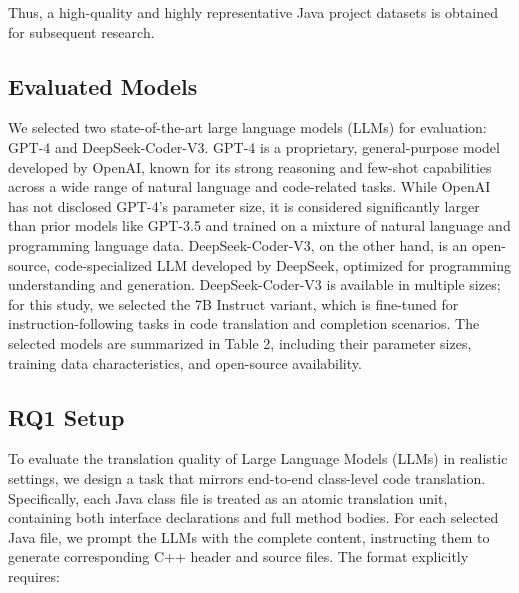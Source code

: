 Thus, a high-quality and highly representative Java project datasets is obtained for subsequent research.




\subsection{Evaluated Models}

We selected two state-of-the-art large language models (LLMs) for evaluation: GPT-4 and DeepSeek-Coder-V3. GPT-4 is a proprietary, general-purpose model developed by OpenAI, known for its strong reasoning and few-shot capabilities across a wide range of natural language and code-related tasks. While OpenAI has not disclosed GPT-4’s parameter size, it is considered significantly larger than prior models like GPT-3.5 and trained on a mixture of natural language and programming language data. DeepSeek-Coder-V3, on the other hand, is an open-source, code-specialized LLM developed by DeepSeek, optimized for programming understanding and generation. DeepSeek-Coder-V3 is available in multiple sizes; for this study, we selected the 7B Instruct variant, which is fine-tuned for instruction-following tasks in code translation and completion scenarios. The selected models are summarized in Table 2, including their parameter sizes, training data characteristics, and open-source availability.


\subsection{RQ1 Setup}
To evaluate the translation quality of Large Language Models (LLMs) in realistic settings, we design a task that mirrors end-to-end class-level code translation. Specifically, each Java class file is treated as an atomic translation unit, containing both interface declarations and full method bodies. For each selected Java file, we prompt the LLMs with the complete content, instructing them to generate corresponding C++ header and source files. The format explicitly requires:

